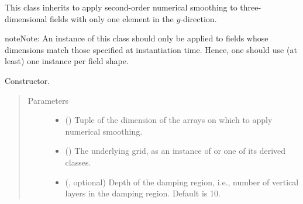 \documentclass[letterpaper,10pt,english]{sphinxmanual}
\begin{document}

\begin{fulllineitems}
\label{\detokenize{api:dycore.horizontal_smoothing.HorizontalSmoothingSecondOrderXZ}}
This class inherits {\hyperref[\detokenize{api:dycore.horizontal_smoothing.HorizontalSmoothing}]{}} to apply second-order numerical smoothing to
three-dimensional fields with only one element in the \(y\)-direction.

\begin{sphinxadmonition}{note}{Note:}
An instance of this class should only be applied to fields whose dimensions match those specified at instantiation time.
Hence, one should use (at least) one instance per field shape.
\end{sphinxadmonition}

\begin{fulllineitems}
\label{\detokenize{api:dycore.horizontal_smoothing.HorizontalSmoothingSecondOrderXZ.__init__}}
Constructor.
\begin{quote}\begin{description}
\item[{Parameters}] \leavevmode\begin{itemize}
\item {} 
 () \textendash{} Tuple of the dimension of the arrays on which to apply numerical smoothing.

\item {} 
 () \textendash{} The underlying grid, as an instance of {\hyperref[\detokenize{api:grids.grid_xyz.GridXYZ}]{}} or one of its derived classes.

\item {} 
 (, optional) \textendash{} Depth of the damping region, i.e., number of vertical layers in the damping region. Default is 10.


\end{itemize}
\end{description}
\end{quote}
\end{fulllineitems}
\end{fulllineitems}
\end{document}
